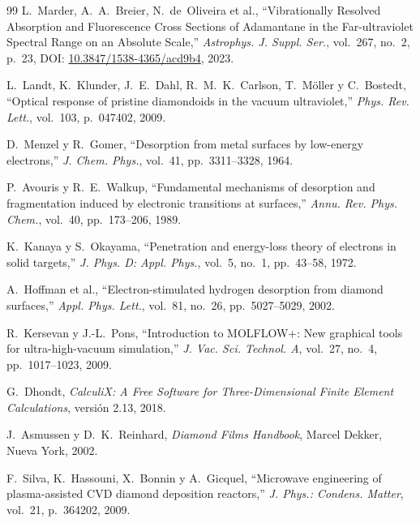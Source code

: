 \documentclass[10pt,twocolumn,a4paper]{article}
\begin{document}
\begin{thebibliography}{99}
L.~Marder, A.~A.~Breier, N.~de~Oliveira et al., ``Vibrationally Resolved Absorption and Fluorescence Cross Sections of Adamantane in the Far-ultraviolet Spectral Range on an Absolute Scale,'' \textit{Astrophys. J. Suppl. Ser.}, vol.~267, no.~2, p.~23, DOI: \href{https://doi.org/10.3847/1538-4365/acd9b4}{10.3847/1538-4365/acd9b4}, 2023.

L.~Landt, K.~Klunder, J.~E.~Dahl, R.~M.~K.~Carlson, T.~Möller y C.~Bostedt, ``Optical response of pristine diamondoids in the vacuum ultraviolet,'' \textit{Phys. Rev. Lett.}, vol.~103, p.~047402, 2009.

D.~Menzel y R.~Gomer, ``Desorption from metal surfaces by low-energy electrons,'' \textit{J. Chem. Phys.}, vol.~41, pp.~3311--3328, 1964.

P.~Avouris y R.~E.~Walkup, ``Fundamental mechanisms of desorption and fragmentation induced by electronic transitions at surfaces,'' \textit{Annu. Rev. Phys. Chem.}, vol.~40, pp.~173--206, 1989.

K.~Kanaya y S.~Okayama, ``Penetration and energy-loss theory of electrons in solid targets,'' \textit{J. Phys. D: Appl. Phys.}, vol.~5, no.~1, pp.~43--58, 1972.

A.~Hoffman et al., ``Electron-stimulated hydrogen desorption from diamond surfaces,'' \textit{Appl. Phys. Lett.}, vol.~81, no.~26, pp.~5027--5029, 2002.

R.~Kersevan y J.-L.~Pons, ``Introduction to MOLFLOW+: New graphical tools for ultra-high-vacuum simulation,'' \textit{J. Vac. Sci. Technol. A}, vol.~27, no.~4, pp.~1017--1023, 2009.

G.~Dhondt, \textit{CalculiX: A Free Software for Three-Dimensional Finite Element Calculations}, versión 2.13, 2018.

J.~Asmussen y D.~K.~Reinhard, \textit{Diamond Films Handbook}, Marcel Dekker, Nueva York, 2002.

F.~Silva, K.~Hassouni, X.~Bonnin y A.~Gicquel, ``Microwave engineering of plasma-assisted CVD diamond deposition reactors,'' \textit{J. Phys.: Condens. Matter}, vol.~21, p.~364202, 2009.

\end{thebibliography}
\end{document}
